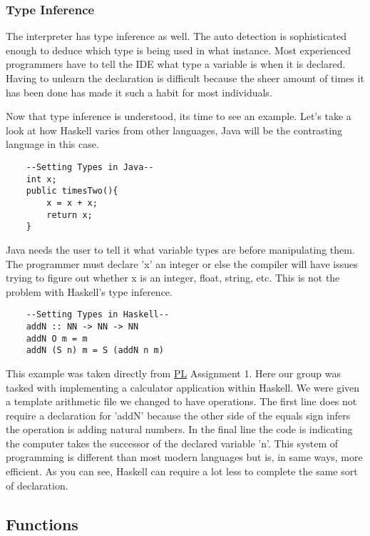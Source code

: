 \documentclass{article}
\begin{document}
    
    \subsubsection{Type Inference}
    The interpreter has type inference as well. The auto detection is sophisticated enough to deduce which type is being used in what instance. Most experienced programmers have to tell the IDE what type a variable is when it is declared. Having to unlearn the declaration is difficult because the sheer amount of times it has been done has made it such a habit for most individuals.
    
    \medskip\noindent Now that type inference is understood, its time to see an example. Let's take a look at how Haskell varies from other languages, Java will be the contrasting language in this case.
    \begin{lstlisting}
    --Setting Types in Java--
    int x;
    public timesTwo(){
        x = x + x;
        return x;
    }
    \end{lstlisting}
    
    \medskip
    Java needs the user to tell it what variable types are before manipulating them. The programmer must declare 'x' an integer or else the compiler will have issues trying to figure out whether x is an integer, float, string, etc. This is not the problem with Haskell's type inference.
    
    \begin{lstlisting}
    --Setting Types in Haskell--
    addN :: NN -> NN -> NN
    addN O m = m
    addN (S n) m = S (addN n m)
    \end{lstlisting}
    
    \noindent This example was taken directly from \href{PL}{PL} Assignment 1. Here our group was tasked with implementing a calculator application within Haskell. We were given a template arithmetic file we changed to have operations. The first line does not require a declaration for 'addN' because the other side of the equals sign infers the operation is adding natural numbers. In the final line the code is indicating the computer takes the successor of the declared variable 'n'. This system of programming is different than most modern languages but is, in same ways, more efficient. As you can see, Haskell can require a lot less to complete the same sort of declaration.
    
\subsection{Functions}
    
\end{document}
